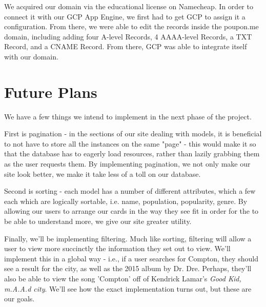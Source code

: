 \documentclass{scrartcl}
\begin{document}
    We acquired our domain via the educational license on Namecheap. In order to connect it with our GCP App Engine, we first had to get GCP to assign it a configuration. From there, we were able to edit the records inside the poupon.me domain, including adding four A-level Records, 4 AAAA-level Records, a TXT Record, and a CNAME Record. From there, GCP was able to integrate itself with our domain.

    \section{Future Plans}
    We have a few things we intend to implement in the next phase of the project.

    First is pagination - in the sections of our site dealing with models, it is beneficial to not have to store all the instances on the same "page" - this would make it so that the database has to eagerly load resources, rather than lazily grabbing them as the user requests them. By implementing pagination, we not only make our site look better, we make it take less of a toll on our database.

    Second is sorting - each model has a number of different attributes, which a few each which are logically sortable, i.e. name, population, popularity, genre. By allowing our users to arrange our cards in the way they see fit in order for the to be able to understand more, we give our site greater utility.

    Finally, we'll be implementing filtering. Much like sorting, filtering will allow a user to view more succinctly the information they set out to view. We'll implement this in a global way - i.e., if a user searches for Compton, they should see a result for the city, as well as the 2015 album by Dr. Dre. Perhaps, they'll also be able to view the song 'Compton' off of Kendrick Lamar's \textit{Good Kid, m.A.A.d city}. We'll see how the exact implementation turns out, but these are our goals.
\end{document}
